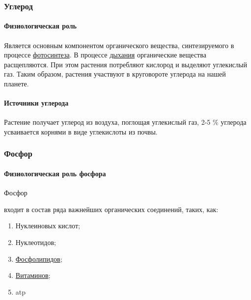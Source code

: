 \subsubsection*{Углерод}

\paragraph*{Физиологическая роль}

\paragraph*{}Является основным компонентом органического вещества, синтезируемого в процессе \hyperlink{photosyntesis}{фотосинтеза}. В процессе \hyperlink{sect_breazing}{дыхания} органические вещества расщепляются. При этом растения потребляют кислород и выделяют углекислый газ. Таким образом, растения участвуют в круговороте углерода на нашей планете. 

\paragraph*{Источники углерода}

\paragraph*{}Растение получает углерод из воздуха, поглощая углекислый газ, 2-5 \% углерода усваивается корнями в виде углекислоты из почвы. 


\subsubsection*{Фосфор}

\paragraph*{Физиологическая роль фосфора}

\paragraph*{}\hypertarget{phosphoros}{Фосфор} входит в состав ряда важнейших органических соединений, таких, как:

\begin{enumerate}

	\item Нуклеиновых кислот;
	\item Нуклеотидов;
	\item \hyperlink{plipids}{Фосфолипидов};
	\item \hyperlink{vitamines}{Витаминов};
	\item \gls{atp}

\end{enumerate}

